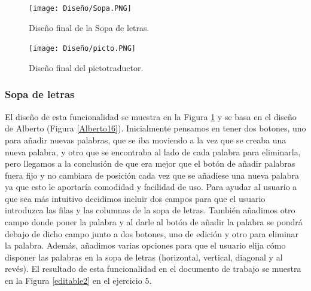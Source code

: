 \begin{figure}[ht!]
  \centering
  \texttt{[image: Diseño/Sopa.PNG]}
  \caption{Diseño final de la Sopa de letras.}
  \label{sopaLetras}
\end{figure}

\begin{figure}[ht!]
  \centering
  \texttt{[image: Diseño/picto.PNG]}
  \caption{Diseño final del pictotraductor.}
  \label{pictotraductor}
\end{figure}
\subsubsection{Sopa de letras}
El diseño de esta funcionalidad se muestra en la Figura \ref{sopaLetras} y se basa en el diseño de Alberto (Figura \ref{Alberto16}). Inicialmente pensamos en tener dos botones, uno para añadir nuevas palabras, que se iba moviendo a la vez que se creaba una nueva palabra, y otro que se encontraba al lado de cada palabra para eliminarla, pero llegamos a la conclusión
de que era mejor que el botón de añadir palabras fuera fijo y no cambiara de posición cada vez que se añadiese una nueva palabra ya que esto le aportaría comodidad y facilidad de uso. Para ayudar al usuario a que sea más intuitivo decidimos incluir dos campos para que el usuario introduzca las filas y las columnas de la sopa de letras. También añadimos otro campo donde poner la palabra y al darle al botón de añadir la palabra se pondrá debajo de dicho campo junto a dos botones, uno de edición y otro para eliminar la palabra. Además, añadimos varias opciones para que el usuario elija cómo disponer las palabras en la sopa de letras (horizontal, vertical, diagonal y al revés). El resultado de esta funcionalidad en el documento de trabajo se muestra en la Figura \ref{editable2} en el ejercicio 5.



